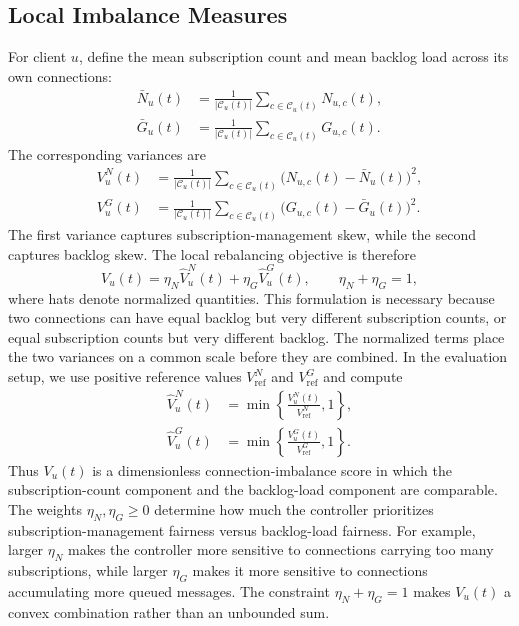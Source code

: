 \subsection{Local Imbalance Measures}

For client $u$, define the mean subscription count and mean backlog load across
its own connections:
\begin{align}
	\bar{N}_u(t)
	&= \frac{1}{|\mathcal{C}_u(t)|}
	\sum_{c\in\mathcal{C}_u(t)} N_{u,c}(t),\\
	\bar{G}_u(t)
	&= \frac{1}{|\mathcal{C}_u(t)|}
	\sum_{c\in\mathcal{C}_u(t)} G_{u,c}(t).
\end{align}
The corresponding variances are
\begin{align}
	V^N_u(t)
	&= \frac{1}{|\mathcal{C}_u(t)|}
	\sum_{c\in\mathcal{C}_u(t)}
	\bigl(N_{u,c}(t)-\bar{N}_u(t)\bigr)^2,\\
	V^G_u(t)
	&= \frac{1}{|\mathcal{C}_u(t)|}
	\sum_{c\in\mathcal{C}_u(t)}
	\bigl(G_{u,c}(t)-\bar{G}_u(t)\bigr)^2.
\end{align}
The first variance captures subscription-management skew, while the second
captures backlog skew. The local rebalancing objective is therefore
\begin{equation}
	V_u(t)=
	\eta_N\widehat{V}^N_u(t)
	+\eta_G\widehat{V}^G_u(t),
	\qquad
	\eta_N+\eta_G=1,
	\label{eq:local_connection_imbalance}
\end{equation}
where hats denote normalized quantities. This formulation is necessary because
two connections can have equal backlog but very different subscription counts,
or equal subscription counts but very different backlog.
The normalized terms place the two variances on a common scale before they are
combined. In the evaluation setup, we use positive reference values
$V^N_{\mathrm{ref}}$ and $V^G_{\mathrm{ref}}$ and compute
\begin{align*}
	\widehat{V}^N_u(t)
	&=\min\left\{\frac{V^N_u(t)}{V^N_{\mathrm{ref}}},1\right\},\\
	\widehat{V}^G_u(t)
	&=\min\left\{\frac{V^G_u(t)}{V^G_{\mathrm{ref}}},1\right\}.
\end{align*}
Thus $V_u(t)$ is a dimensionless connection-imbalance score in which the
subscription-count component and the backlog-load component are comparable.
The weights $\eta_N,\eta_G\geq0$ determine how much the controller prioritizes
subscription-management fairness versus backlog-load fairness. For example,
larger $\eta_N$ makes the controller more sensitive to connections carrying
too many subscriptions, while larger $\eta_G$ makes it more sensitive to
connections accumulating more queued messages. The constraint
$\eta_N+\eta_G=1$ makes $V_u(t)$ a convex combination rather than an
unbounded sum.

